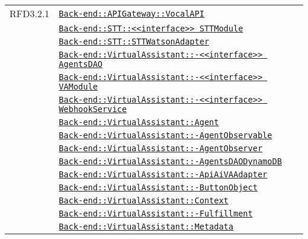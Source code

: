 \begin{longtable}{|>{\centering}m{3cm}|m{10cm}<{\centering}|}
RFD3.2.1 & \hyperref[Back-end::APIGateway::VocalAPI]{\texttt{Back-end::APIGateway::VocalAPI}}\\
& \hyperref[Back-end::STT::<<interface>> STTModule]{\texttt{Back-end::STT::<<interface>> STTModule}}\\
& \hyperref[Back-end::STT::STTWatsonAdapter]{\texttt{Back-end::STT::STTWatsonAdapter}}\\
& \hyperref[Back-end::VirtualAssistant::<<interface>> AgentsDAO]{\texttt{Back-end::VirtualAssistant::-\linebreak <<interface>> AgentsDAO}}\\
& \hyperref[Back-end::VirtualAssistant::<<interface>> VAModule]{\texttt{Back-end::VirtualAssistant::-\linebreak <<interface>> VAModule}}\\
& \hyperref[Back-end::VirtualAssistant::<<interface>> WebhookService]{\texttt{Back-end::VirtualAssistant::-\linebreak <<interface>> WebhookService}}\\
& \hyperref[Back-end::VirtualAssistant::Agent]{\texttt{Back-end::VirtualAssistant::Agent}}\\
& \hyperref[Back-end::VirtualAssistant::AgentObservable]{\texttt{Back-end::VirtualAssistant::-\linebreak AgentObservable}}\\
& \hyperref[Back-end::VirtualAssistant::AgentObserver]{\texttt{Back-end::VirtualAssistant::-\linebreak AgentObserver}}\\
& \hyperref[Back-end::VirtualAssistant::AgentsDAODynamoDB]{\texttt{Back-end::VirtualAssistant::-\linebreak AgentsDAODynamoDB}}\\
& \hyperref[Back-end::VirtualAssistant::ApiAiVAAdapter]{\texttt{Back-end::VirtualAssistant::-\linebreak ApiAiVAAdapter}}\\
& \hyperref[Back-end::VirtualAssistant::ButtonObject]{\texttt{Back-end::VirtualAssistant::-\linebreak ButtonObject}}\\
& \hyperref[Back-end::VirtualAssistant::Context]{\texttt{Back-end::VirtualAssistant::Context}}\\
& \hyperref[Back-end::VirtualAssistant::Fulfillment]{\texttt{Back-end::VirtualAssistant::-\linebreak Fulfillment}}\\
& \hyperref[Back-end::VirtualAssistant::Metadata]{\texttt{Back-end::VirtualAssistant::Metadata}}\\

\end{longtable}
